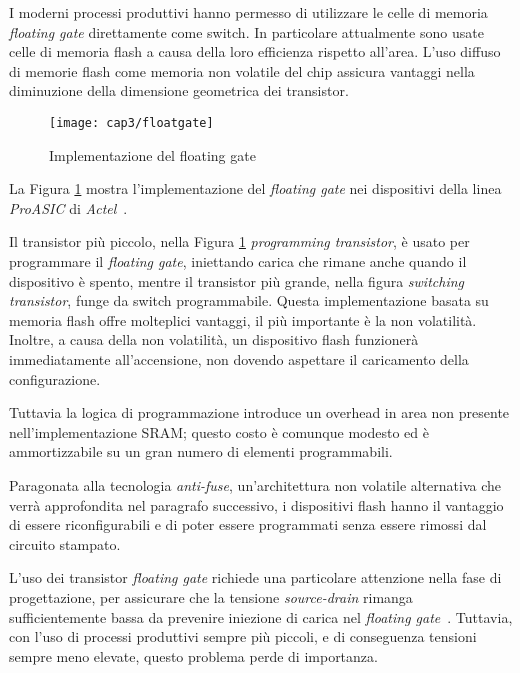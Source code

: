 I moderni processi produttivi hanno permesso di utilizzare le celle di memoria \textit{floating gate} direttamente come switch. In particolare attualmente sono usate celle di memoria flash a causa della loro efficienza rispetto all'area. L'uso diffuso di memorie flash come memoria non volatile del chip assicura vantaggi nella diminuzione della dimensione geometrica dei transistor.

\begin{figure}[H]  
  \begin{center}
    \texttt{[image: cap3/floatgate]}
    \caption{Implementazione del floating gate}
    \label{floatgate}
  \end{center}
\end{figure}

La Figura \ref{floatgate} mostra l'implementazione del \textit{floating gate} nei dispositivi della linea \textit{ProASIC} di \textit{Actel}~\cite{actelpro}. 

Il transistor più piccolo, nella Figura \ref{floatgate} \textit{programming transistor}, è usato per programmare il \textit{floating gate}, iniettando carica che rimane anche quando il dispositivo è spento, mentre il transistor più grande, nella figura \textit{switching transistor}, funge da switch programmabile. Questa implementazione basata su memoria flash offre molteplici vantaggi, il più importante è la non volatilità. Inoltre, a causa della non volatilità, un dispositivo flash funzionerà immediatamente all'accensione, non dovendo aspettare il caricamento della configurazione.

Tuttavia la logica di programmazione introduce un overhead in area non presente nell'implementazione SRAM; questo costo è comunque modesto ed è ammortizzabile su un gran numero di elementi programmabili.

Paragonata alla tecnologia \textit{anti-fuse}, un'architettura non volatile alternativa che verrà approfondita nel paragrafo successivo, i dispositivi flash hanno il vantaggio di essere riconfigurabili e di poter essere programmati senza essere rimossi dal circuito stampato.

L'uso dei transistor \textit{floating gate} richiede una particolare attenzione nella fase di progettazione, per assicurare che la tensione \textit{source-drain} rimanga sufficientemente bassa da prevenire iniezione di carica nel \textit{floating gate}~\cite{510550}. Tuttavia, con l'uso di processi produttivi sempre più piccoli, e di conseguenza tensioni sempre meno elevate, questo problema perde di importanza.


